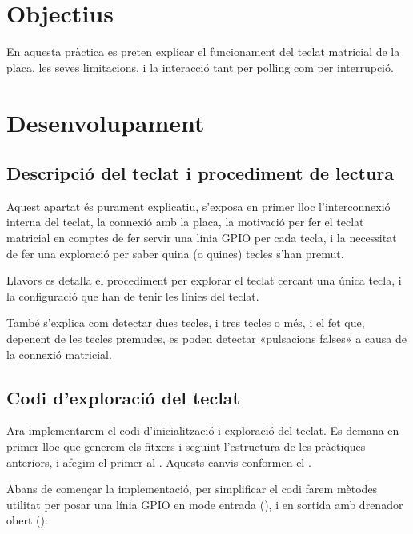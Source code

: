 
\section{Objectius}

En aquesta pràctica es preten explicar el funcionament del teclat matricial de
la placa, les seves limitacions, i la interacció tant per polling com per interrupció.

\section{Desenvolupament}


\subsection{Descripció del teclat i procediment de lectura}

Aquest apartat és purament explicatiu, s'exposa en primer lloc l'interconnexió interna
del teclat, la connexió amb la placa, la motivació per fer el teclat matricial en comptes
de fer servir una línia GPIO per cada tecla, i la necessitat de fer una exploració
per saber quina (o quines) tecles s'han premut.

Llavors es detalla el procediment per explorar el teclat cercant una única tecla,
i la configuració que han de tenir les línies del teclat.

També s'explica com detectar dues tecles, i tres tecles o més, i el fet que, depenent
de les tecles premudes, es poden detectar «pulsacions falses» a causa de la connexió matricial.


\subsection{Codi d'exploració del teclat}

Ara implementarem el codi d'inicialització i exploració del teclat.
Es demana en primer lloc que generem els fitxers  i 
seguint l'estructura de les pràctiques anteriors, i afegim el primer al .
Aquests canvis conformen el .

\voluntari
Abans de començar la implementació, per simplificar el codi farem mètodes utilitat
per posar una línia GPIO en mode entrada (), i en sortida amb
drenador obert ():

